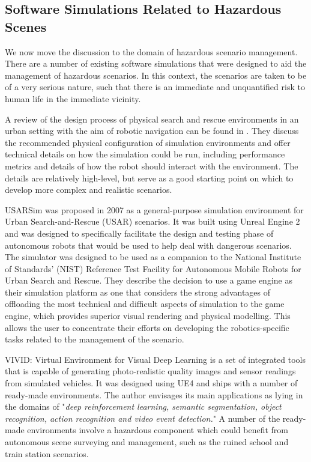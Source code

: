 \subsection{Software Simulations Related to Hazardous Scenes}\label{subsec:RelatedSimulations}
We now move the discussion to the domain of hazardous scenario management. There are a number of existing software simulations that were designed to aid the management of hazardous scenarios. In this context, the scenarios are taken to be of a very serious nature, such that there is an immediate and unquantified risk to human life in the immediate vicinity.

\par A review of the design process of physical search and rescue environments in an urban setting with the aim of robotic navigation can be found in \cite{Jacoff2003TestRobots}. They discuss the recommended physical configuration of simulation environments and offer technical details on how the simulation could be run, including performance metrics and details of how the robot should interact with the environment. The details are relatively high-level, but serve as a good starting point on which to develop more complex and realistic scenarios.

USARSim \cite{Carpin2007USARSim:Education} was proposed in 2007 as a general-purpose simulation environment for Urban Search-and-Rescue (USAR) scenarios. It was built using Unreal Engine 2 and was designed to specifically facilitate the design and testing phase of autonomous robots that would be used to help deal with dangerous scenarios. The simulator was designed to be used as a companion to the National Institute of Standards’ (NIST) Reference Test Facility for Autonomous Mobile Robots for Urban Search and Rescue. They describe the decision to use a game engine as their simulation platform as one that considers the strong advantages of offloading the most technical and difficult aspects of simulation to the game engine, which provides superior visual rendering and physical modelling. This allows the user to concentrate their efforts on developing the robotics-specific tasks related to the management of the scenario.\par


VIVID: Virtual Environment for Visual Deep Learning \cite{Lai2018ViviD:Learning} is a set of integrated tools that is capable of generating photo-realistic quality images and sensor readings from simulated vehicles. It was designed using UE4 and ships with a number of ready-made environments. The author envisages its main applications as lying in the domains of "\textit{deep reinforcement learning, semantic segmentation, object recognition, action recognition and video event detection.}" A number of the ready-made environments involve a hazardous component which could benefit from autonomous scene surveying and management, such as the ruined school and train station scenarios.


